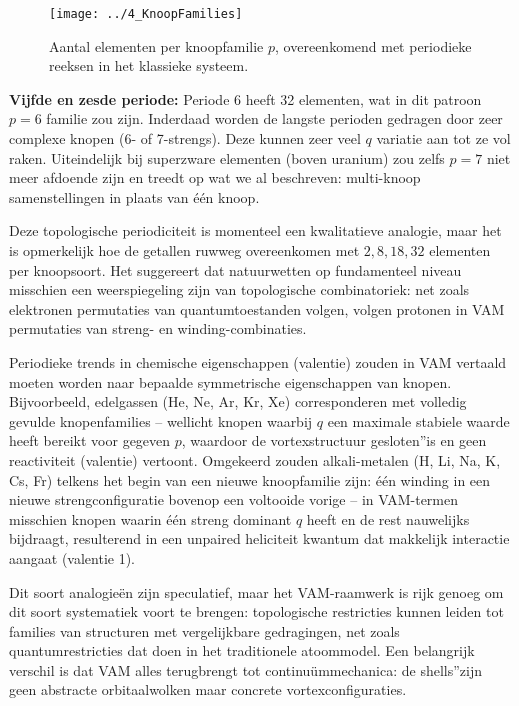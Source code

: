 \begin{figure}[H]
    \centering
    \texttt{[image: ../4\_KnoopFamilies]}
    \caption{Aantal elementen per knoopfamilie $p$, overeenkomend met periodieke reeksen in het klassieke systeem.}
    \label{fig:knoopfamilies}
\end{figure}

\textbf{Vijfde en zesde periode:} Periode 6 heeft 32 elementen, wat in dit patroon $p=6$ familie zou zijn. Inderdaad worden de langste perioden gedragen door zeer complexe knopen (6- of 7-strengs). Deze kunnen zeer veel $q$ variatie aan tot ze vol raken. Uiteindelijk bij superzware elementen (boven uranium) zou zelfs $p=7$ niet meer afdoende zijn en treedt op wat we al beschreven: multi-knoop samenstellingen in plaats van één knoop.

Deze topologische periodiciteit is momenteel een kwalitatieve analogie, maar het is opmerkelijk hoe de getallen ruwweg overeenkomen met $2, 8, 18, 32$ elementen per knoopsoort. Het suggereert dat natuurwetten op fundamenteel niveau misschien een weerspiegeling zijn van topologische combinatoriek: net zoals elektronen permutaties van quantumtoestanden volgen, volgen protonen in VAM permutaties van streng- en winding-combinaties.

Periodieke trends in chemische eigenschappen (valentie) zouden in VAM vertaald moeten worden naar bepaalde symmetrische eigenschappen van knopen. Bijvoorbeeld, edelgassen (He, Ne, Ar, Kr, Xe) corresponderen met volledig gevulde knopenfamilies – wellicht knopen waarbij $q$ een maximale stabiele waarde heeft bereikt voor gegeven $p$, waardoor de vortexstructuur \grqq gesloten\textquotedblright is en geen reactiviteit (valentie) vertoont. Omgekeerd zouden alkali-metalen (H, Li, Na, K, Cs, Fr) telkens het begin van een nieuwe knoopfamilie zijn: één winding in een nieuwe strengconfiguratie bovenop een voltooide vorige – in VAM-termen misschien knopen waarin één streng dominant $q$ heeft en de rest nauwelijks bijdraagt, resulterend in een unpaired heliciteit kwantum dat makkelijk interactie aangaat (valentie 1).

Dit soort analogieën zijn speculatief, maar het VAM-raamwerk is rijk genoeg om dit soort systematiek voort te brengen: topologische restricties kunnen leiden tot families van structuren met vergelijkbare gedragingen, net zoals quantumrestricties dat doen in het traditionele atoommodel. Een belangrijk verschil is dat VAM alles terugbrengt tot continuümmechanica: de \grqq shells\textquotedblright zijn geen abstracte orbitaalwolken maar concrete vortexconfiguraties.